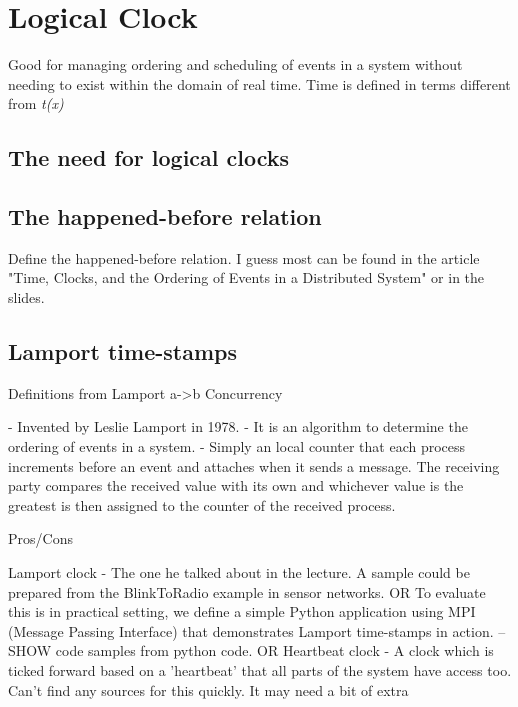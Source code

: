 \section{Logical Clock}\label{sc:logicalClock}

Good for managing ordering and scheduling of events in a system without needing to exist within the domain of real time. Time is defined in terms different from \textit{t(x)}

\subsection{The need for logical clocks}

\subsection{The happened-before relation}

Define the happened-before relation. I guess most can be found in the article "Time, Clocks, and the Ordering of Events in a Distributed System" or in the slides.

\subsection{Lamport time-stamps}

Definitions from Lamport
a->b
Concurrency

- Invented by Leslie Lamport in 1978.
- It is an algorithm to determine the ordering of events in a system.
- Simply an local counter that each process increments before an event and attaches when it sends a message. The receiving party compares the received value with its own and whichever value is the greatest is then assigned to the counter of the received process.

Pros/Cons

Lamport clock - The one he talked about in the lecture.
A sample could be prepared from the BlinkToRadio example in sensor networks.
OR
To evaluate this is in practical setting, we define a simple Python application using MPI (Message Passing Interface) that demonstrates Lamport time-stamps in action.
-- SHOW code samples from python code.
OR
Heartbeat clock - A clock which is ticked forward based on a 'heartbeat' that all parts of the system have access too.
Can't find any sources for this quickly. It may need a bit of extra 